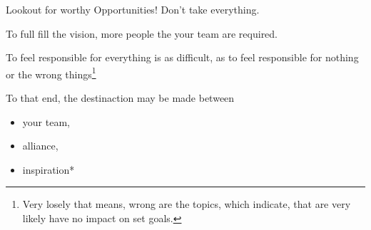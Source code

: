 \begin{center}
	Lookout for worthy Opportunities! Don't take everything.
\end{center}
To full fill the vision, more people the your team are required.

To feel responsible for everything is as difficult, as to feel responsible for nothing or the wrong things\footnote{
	Very losely that means, wrong are the topics, which indicate, that are very likely have no impact on set goals.
}


To that end, the destinaction may be made between
\begin{itemize}
	\item your team,
	\item alliance,
	\item inspiration*
\end{itemize}

